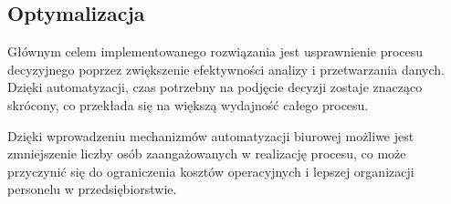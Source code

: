 \subsection{Optymalizacja}
Głównym celem implementowanego rozwiązania jest usprawnienie procesu decyzyjnego poprzez zwiększenie efektywności analizy i przetwarzania danych. Dzięki automatyzacji, czas potrzebny na podjęcie decyzji zostaje znacząco skrócony, co przekłada się na większą wydajność całego procesu.

Dzięki wprowadzeniu mechanizmów automatyzacji biurowej możliwe jest zmniejszenie liczby osób zaangażowanych w realizację procesu, co może przyczynić się do ograniczenia kosztów operacyjnych i lepszej organizacji personelu w przedsiębiorstwie.

\begin{comment}
Priorytetem implementowanego rozwiązania jest usprawnienie całego procesu decyzyjnego. Głównym elementem jest redukcja czasu wymaganego na realizację poszczególnych zadań, co osiągnięto dzięki wprowadzeniu mechanizmów automatyzacji biurowej. Ważnym aspektem jest również poprawa efektywności analizy oraz przetwarzania danych przez użytkowników, umożliwiając podejmowanie bardziej trafnych decyzji w krótszym czasie.

Zmniejszenie liczby osób zaangażowanych w realizację procesu umożliwia optymalizację wykorzystania zasobów ludzkich. Dzięki temu możliwe jest ograniczenie kosztów operacyjnych i bardziej efektywne zarządzanie personelem, co przyczynia się do zwiększenia ogólnej wydajności przedsiębiorstwa.
\end{comment}
